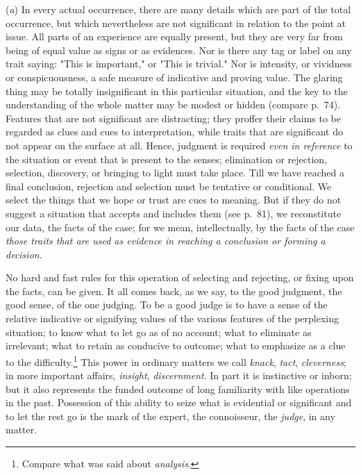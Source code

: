 \documentclass[showtrims,ustradepaper]{memoir}
\begin{document}
(\emph{a}) In every actual occurrence, there are many details which are
part of the total occurrence, but which nevertheless are not significant
in relation to the point at issue. All parts of an experience are
equally present, but they are very far from being of equal value as
signs or as evidences. Nor is there any tag or label on any trait
saying: "This is important," or "This is trivial." Nor is intensity, or
vividness or conspicuousness, a safe measure of indicative and proving
value. The glaring thing may be totally insignificant in this particular
situation, and the key to the understanding of the whole matter may be
modest or hidden (compare p.\ 74). Features that are not significant are
distracting; they proffer their claims to be regarded as clues and cues
to interpretation, while traits that are significant do not appear on
the surface at all. Hence, judgment is required \emph{even in reference}
to the situation or event that is present to the senses; elimination or
rejection, selection, discovery, or bringing to light must take
place.
Till we have reached a final conclusion, rejection and selection must be
tentative or conditional. We select the things that we hope or trust are
cues to meaning. But if they do not suggest a situation that accepts and
includes them (see p.\ 81), we reconstitute our data, the facts of the
case; for we mean, intellectually, by the facts of the case \emph{those
traits that are used as evidence in reaching a conclusion or forming a
decision}.


No hard and fast rules for this operation of selecting and rejecting, or
fixing upon the facts, can be given. It all comes back, as we say, to
the good judgment, the good sense, of the one judging. To be a good
judge is to have a sense of the relative indicative or signifying values
of the various features of the perplexing situation; to know what to let
go as of no account; what to eliminate as irrelevant; what to retain as
conducive to outcome; what to emphasize as a clue to the
difficulty.\footnote{ Compare what was said about \emph{analysis}. }
This power in ordinary matters we call \emph{knack}, \emph{tact},
\emph{cleverness}; in more important affairs, \emph{insight},
\emph{discernment}. In part it is instinctive or inborn; but it also
represents the funded outcome of long familiarity with like operations
in the past. Possession of this ability to seize what is evidential or
significant and to let the rest go is the mark of the expert, the
connoisseur, the \emph{judge}, in any matter.
\end{document}
